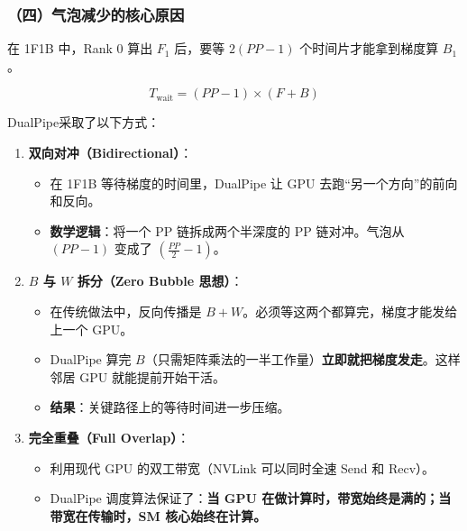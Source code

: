 \hypertarget{ux56dbux6c14ux6ce1ux51cfux5c11ux7684ux6838ux5fc3ux539fux56e0}{%
\subsubsection{（四）气泡减少的核心原因}\label{ux56dbux6c14ux6ce1ux51cfux5c11ux7684ux6838ux5fc3ux539fux56e0}}

在 1F1B 中，Rank 0 算出 \(F_1\) 后，要等 \(2(PP - 1)\) 个时间片才能拿到梯度算 \(B_1\)。

\[
T_{\mathrm{wait}} = (PP - 1) \times (F + B)
\]

DualPipe采取了以下方式：

\begin{enumerate}
\def\labelenumi{\arabic{enumi}.}
\tightlist
\item
{}
  \textbf{双向对冲（Bidirectional）}：

  \begin{itemize}
  \tightlist
  \item
    在 1F1B 等待梯度的时间里，DualPipe 让 GPU 去跑``另一个方向''的前向和反向。
  \item
    \textbf{数学逻辑}：将一个 PP 链拆成两个半深度的 PP 链对冲。气泡从 \((PP - 1)\) 变成了 \(\left(\frac{PP}{2} - 1\right)\)。
  \end{itemize}
\item
{}
  \textbf{\(B\) 与 \(W\) 拆分（Zero Bubble 思想）}：

  \begin{itemize}
  \tightlist
  \item
    在传统做法中，反向传播是 \(B + W\)。必须等这两个都算完，梯度才能发给上一个 GPU。
  \item
    DualPipe 算完 \(B\)（只需矩阵乘法的一半工作量）\textbf{立即就把梯度发走}。这样邻居 GPU 就能提前开始干活。
  \item
    \textbf{结果}：关键路径上的等待时间进一步压缩。
  \end{itemize}
\item
{}
  \textbf{完全重叠（Full Overlap）}：

  \begin{itemize}
  \tightlist
  \item
    利用现代 GPU 的双工带宽（NVLink 可以同时全速 Send 和 Recv）。
  \item
    DualPipe 调度算法保证了：\textbf{当 GPU 在做计算时，带宽始终是满的；当带宽在传输时，SM 核心始终在计算。}
  \end{itemize}
\end{enumerate}

